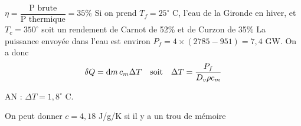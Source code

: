 \begin{solution}

    \begin{questions}
        \question $\eta = \dfrac{\text{P brute}}{\text{P thermique}} = 35\%$
        \question Si on prend $T_f = 25^\circ$ C, l'eau de la Gironde en hiver, et $T_c = 350^\circ$ soit un rendement de Carnot de 52\% et de Curzon de 35\%
        \question La puissance envoyée dans l'eau est environ $P_f = 4\times (2785 - 951) = 7,4$ GW. On a donc
        $$\delta Q = \dd{m} c_m \Delta T \qqtext{soit} \Delta T = \dfrac{P_f}{D_v \rho c_m}$$

        AN :         $\Delta T = 1,8^\circ$ C.

        On peut donner $c = 4,18$ J/g/K si il y a un trou de mémoire
    \end{questions}
\end{solution}